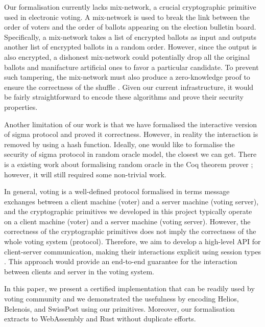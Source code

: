 \documentclass[conference,compsoc]{IEEEtran}
\begin{document}
   Our formalisation currently lacks mix-network, a crucial cryptographic primitive used 
   in electronic voting. A mix-network is used to break the link between the order of 
   voters and the order of ballots appearing on the election bulletin board. 
   Specifically, a mix-network takes a list of encrypted ballots as input and 
   outputs another list of encrypted ballots in a random order.
   However, since the output is also encrypted, a dishonest mix-network could 
   potentially drop all the original ballots and manifacture artificial ones to favor a 
   particular candidate. To prevent such tampering, the mix-network must also 
   produce a zero-knowledge proof to ensure the correctness of the shuffle \cite{10.1007/978-3-642-02620-1_28,10.1007/978-3-030-51280-4_3}.
   Given our current infrastructure, it would be fairly straightforward to 
   encode these algorithms and prove their security properties. 
   

   Another limitation of our work is 
   that we have formalised the interactive version 
   of sigma protocol and proved it correctness. However, 
   in reality the interaction is removed by 
   using a hash function. Ideally, one would like 
   to formalise the security of sigma protocol in random oracle 
   model, the closest we can get. There is a existing 
   work about formalising random oracle in the Coq theorem 
   prover \cite{10.1007/11617990_3}; however, it 
   will still required some non-trivial work. 
   
   
  In general, voting is a well-defined protocol formalised in terms 
  message exchanges between a client machine (voter) and a server machine (voting server), 
  and the cryptographic primitives we developed in this project typically operate on 
  a client machine (voter) and a server machine (voting server). 
  However, the correctness of the cryptographic primitives does not imply the 
  correctness of the whole voting system (protocol). Therefore, we aim to develop 
  a high-level API for client-server communication, making their interactions explicit 
  using session types \cite{10.1145/3453483.3454041}. 
  This approach would provide an end-to-end guarantee for the interaction 
  between clients and server in the voting system. 




 

  In this paper, we present a certified implementation 
  that can be readily used by voting community and 
  we demonstrated the usefulness by encoding Helios, 
  Belenois, and SwissPost using our primitives. 
  Moreover, our formalisation extracts to WebAssembly and 
  Rust without duplicate efforts. 











\end{document}
